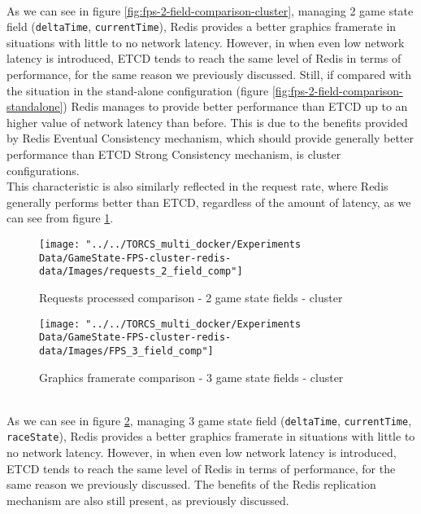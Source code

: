 \\ As we can see in figure \ref{fig:fps-2-field-comparison-cluster}, managing 2 game state field (\texttt{deltaTime}, \texttt{currentTime}), Redis provides a better graphics framerate in situations with little to no network latency. However, in when even low network latency is introduced, ETCD tends to reach the same level of Redis in terms of performance, for the same reason we previously discussed. Still, if compared with the situation in the stand-alone configuration (figure \ref{fig:fps-2-field-comparison-standalone}) Redis manages to provide better performance than ETCD up to an higher value of network latency than before. This is due to the benefits provided by Redis Eventual Consistency mechanism, which should provide generally better performance than ETCD Strong Consistency mechanism, is cluster configurations. \\
This characteristic is also similarly reflected in the request rate, where Redis generally performs better than ETCD, regardless of the amount of latency, as we can see from figure \ref{fig:requests-2-field-comparison-cluster}. \\
\begin{figure}[h!]
	\centering
	\texttt{[image: "../../TORCS\_multi\_docker/Experiments Data/GameState-FPS-cluster-redis-data/Images/requests\_2\_field\_comp"]}
	\caption[Requests processed comparison - 2 game state fields - cluster]{Requests processed comparison - 2 game state fields - cluster}
	\label{fig:requests-2-field-comparison-cluster}
\end{figure}
\begin{figure}[h!]
	\centering
	\texttt{[image: "../../TORCS\_multi\_docker/Experiments Data/GameState-FPS-cluster-redis-data/Images/FPS\_3\_field\_comp"]}
	\caption[Graphics framerate comparison - 3 game state fields - cluster]{Graphics framerate comparison - 3 game state fields - cluster}
	\label{fig:fps-3-field-comparison-cluster}
\end{figure}
\\ As we can see in figure \ref{fig:fps-3-field-comparison-cluster}, managing 3 game state field (\texttt{deltaTime}, \texttt{currentTime}, \texttt{raceState}), Redis provides a better graphics framerate in situations with little to no network latency. However, in when even low network latency is introduced, ETCD tends to reach the same level of Redis in terms of performance, for the same reason we previously discussed. The benefits of the Redis replication mechanism are also still present, as previously discussed. \\
